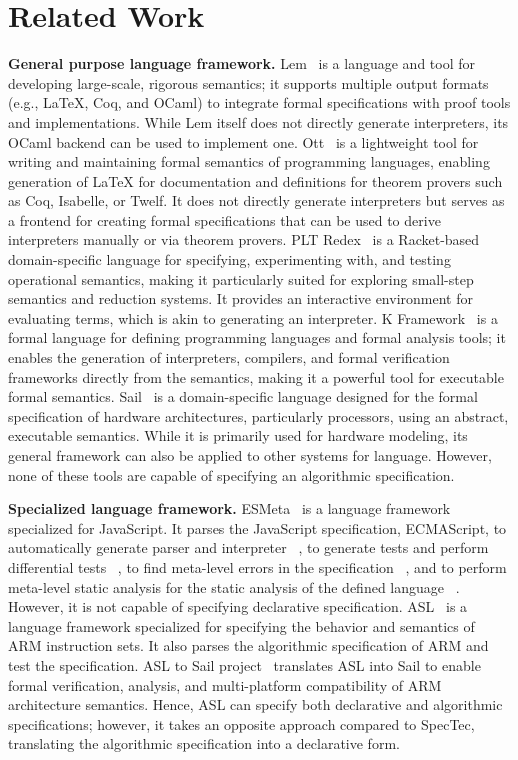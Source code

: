 
\chapter{Related Work}
\label{ch:related}
\noindent



\textbf{General purpose language framework.}
Lem~\cite{lem} is a language and tool for developing large-scale, rigorous
semantics; it supports multiple output formats (e.g., LaTeX, Coq, and OCaml) to
integrate formal specifications with proof tools and implementations.
While Lem itself does not directly generate interpreters, its OCaml backend can
be used to implement one.
Ott~\cite{ott} is a lightweight tool for writing and maintaining formal
semantics of programming languages, enabling generation of LaTeX for
documentation and definitions for theorem provers such as Coq, Isabelle, or
Twelf.
It does not directly generate interpreters but serves as a frontend for
creating formal specifications that can be used to derive interpreters manually
or via theorem provers.
PLT Redex~\cite{plt} is a Racket-based domain-specific language for specifying,
experimenting with, and testing operational semantics, making it particularly
suited for exploring small-step semantics and reduction systems.
It provides an interactive environment for evaluating terms, which is akin to
generating an interpreter.
K Framework~\cite{k} is a formal language for defining programming languages
and formal analysis tools; it enables the generation of interpreters,
compilers, and formal verification frameworks directly from the semantics,
making it a powerful tool for executable formal semantics.
Sail~\cite{sail} is a domain-specific language designed for the formal
specification of hardware architectures, particularly processors, using an
abstract, executable semantics.
While it is primarily used for hardware modeling, its general framework can
also be applied to other systems for language.
However, none of these tools are capable of specifying an algorithmic
specification.


\textbf{Specialized language framework.}
ESMeta~\cite{esmeta} is a language framework specialized for JavaScript.
It parses the JavaScript specification, ECMAScript, to automatically generate
parser and interpreter ~\cite{jiset}, to generate tests and perform
differential tests ~\cite{jest}, to find meta-level errors in the specification
~\cite{jstar}, and to perform meta-level static analysis for the static
analysis of the defined language ~\cite{jsaver}.
However, it is not capable of specifying declarative specification.
ASL~\cite{asl} is a language framework specialized for specifying the behavior
and semantics of ARM instruction sets.
It also parses the algorithmic specification of ARM and test the specification.
ASL to Sail project~\cite{asl2sail} translates ASL into Sail to enable formal
verification, analysis, and multi-platform compatibility of ARM architecture
semantics.
Hence, ASL can specify both declarative and algorithmic specifications;
however, it takes an opposite approach compared to SpecTec, translating the
algorithmic specification into a declarative form.
